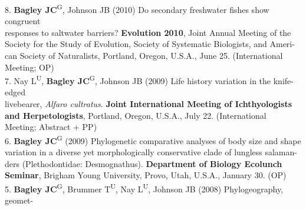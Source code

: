 \documentclass[margin,line]{res}
\begin{document}
\begin{resume}
8. \textbf{Bagley JC}\textsuperscript{G}, Johnson JB (2010) Do secondary freshwater fishes show congruent\\
\hspace*{8mm} responses to saltwater barriers? \textbf{Evolution 2010}, Joint Annual Meeting of the\\ 
\hspace*{8mm} Society for the Study of Evolution, Society of Systematic Biologists, and Ameri-\\
\hspace*{8mm} can Society of Naturalists, Portland, Oregon, U.S.A., June 25. (International\\ \vspace{2mm}
\hspace*{8mm}Meeting; OP) \\
7. Nay L\textsuperscript{U}, \textbf{Bagley JC}\textsuperscript{G}, Johnson JB (2009) Life history variation in the knife-edged\\
\hspace*{8mm} livebearer, \emph{Alfaro cultratus}. \textbf{Joint International Meeting of Ichthyologists}\\
\hspace*{8mm} \textbf{and Herpetologists}, Portland, Oregon, U.S.A., July 22. (International\\ \vspace{2mm}
\hspace*{8mm}Meeting; Abstract + PP) \\
6. \textbf{Bagley JC}\textsuperscript{G} (2009) Phylogenetic comparative analyses of body size and shape\\
\hspace*{8mm} variation in a diverse yet morphologically conservative clade of lungless salaman-\\
\hspace*{8mm} ders (Plethodontidae: Desmognathus). \textbf{Department of Biology Ecolunch}\\ \vspace{2mm}
\hspace*{8mm}\textbf{Seminar}, Brigham Young University, Provo, Utah, U.S.A., January 30. (OP) \\
5. \textbf{Bagley JC}\textsuperscript{G}, Brummer T\textsuperscript{U}, Nay L\textsuperscript{U}, Johnson JB (2008) Phylogeography, geomet-\\

\end{resume}
\end{document}
